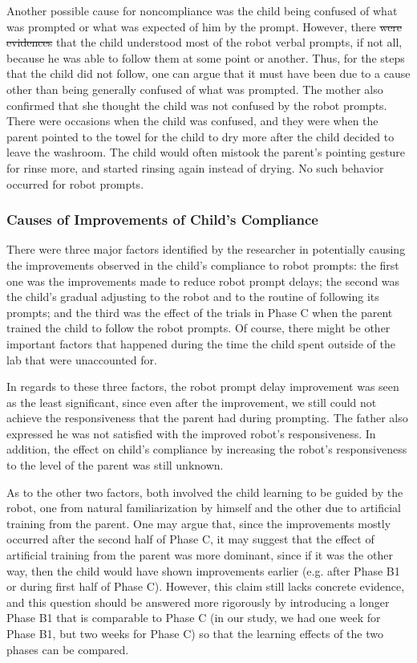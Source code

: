 \documentclass{ut-thesis}
\providecommand{\DIFaddtex}[1]{{\protect\color{blue}\uwave{#1}}} %
\providecommand{\DIFdeltex}[1]{{\protect\color{red}\sout{#1}}}                      %
\providecommand{\DIFaddbegin}{} %
\providecommand{\DIFaddend}{} %
\providecommand{\DIFdelbegin}{} %
\providecommand{\DIFdelend}{} %
\providecommand{\DIFadd}[1]{\texorpdfstring{\DIFaddtex{#1}}{#1}} %
\providecommand{\DIFdel}[1]{\texorpdfstring{\DIFdeltex{#1}}{}} %
\begin{document}
Another possible cause for noncompliance was the child being confused of what was prompted or what was expected of him by the prompt.  However, there \DIFdelbegin \DIFdel{were evidences }\DIFdelend \DIFaddbegin \DIFadd{was evidence }\DIFaddend that the child understood most of the robot verbal prompts, if not all, because he was able to follow them at some point or another.  Thus, for the steps that the child did not follow, one can argue that it must have been due to a cause other than being generally confused of what was prompted.  The mother also confirmed that she thought the child was not confused by the robot prompts.  There were occasions when the child was confused, and they were when the parent pointed to the towel for the child to dry more after the child decided to leave the washroom.  The child would often mistook the parent's pointing gesture for rinse more, and started rinsing again instead of drying.  No such behavior occurred for robot prompts.


\subsubsection{Causes of Improvements of Child's Compliance}
There were three major factors identified by the researcher in potentially causing the improvements observed in the child's compliance to robot prompts: the first one was the improvements made to reduce robot prompt delays; the second was the child's gradual adjusting to the robot and to the routine of following its prompts; and the third was the effect of the trials in Phase C when the parent trained the child to follow the robot prompts.  Of course, there might be other important factors that happened during the time the child spent outside of the lab that were unaccounted for.

In regards to these three factors, the robot prompt delay improvement was seen as the least significant, since even after the improvement, we still could not achieve the responsiveness that the parent had during prompting.  The father also expressed he was not satisfied with the improved robot's responsiveness.   In addition, the effect on child's compliance by increasing the robot's responsiveness to the level of the parent was still unknown.

As to the other two factors, both involved the child learning to be guided by the robot, one from natural familiarization by himself and the other due to artificial training from the parent.  One may argue that, since the improvements mostly occurred after the second half of Phase C, it may suggest that the effect of artificial training from the parent was more dominant, since if it was the other way, then the child would have shown improvements earlier (e.g. after Phase B1 or during first half of Phase C).  However, this claim still lacks concrete evidence, and this question should be answered more rigorously by introducing a longer Phase B1 that is comparable to Phase C (in our study, we had one week for Phase B1, but two weeks for Phase C) so that the learning effects of the two phases can be compared.
\end{document}
